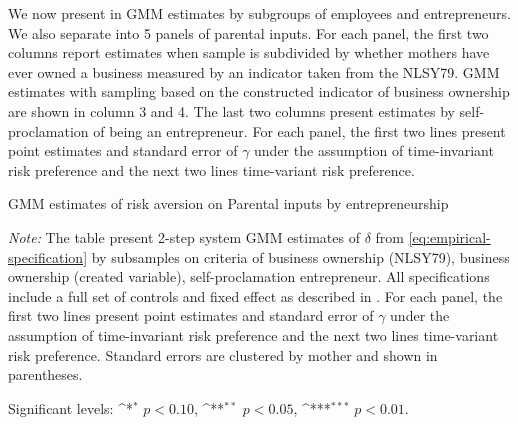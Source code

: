 \documentclass[]{article}
\begin{document}
We now present in  GMM estimates by subgroups of employees and entrepreneurs. We also separate  into 5 panels of parental inputs. For each panel, the first two columns report estimates when sample is subdivided by whether mothers have ever owned a business measured by an indicator taken from the NLSY79. GMM estimates with sampling based on the constructed indicator of business ownership are shown in column 3 and 4. The last two columns present estimates by self-proclamation of being an entrepreneur. For each panel, the first two lines present point estimates and standard error of $\gamma$ under the assumption of time-invariant risk preference and the next two lines time-variant risk preference.


\begin{table}[!htbp]
	\centering
	\begin{threeparttable}
		\def\sym#1{\ifmmode^{#1}\else\(^{#1}\)\fi}
		\caption{GMM estimates of risk aversion on Parental inputs by entrepreneurship}	
		\setlength{\extrarowheight}{0.3em}
		
		\label{table:result-entrepreneur}
		\begin{tablenotes}[flushleft] \footnotesize
			\item \textit{Note:} The table present 2-step system GMM estimates of $\delta$ from \eqref{eq:empirical-specification} by subsamples on criteria of business ownership (NLSY79), business ownership (created variable), self-proclamation entrepreneur. All specifications include a full set of controls and fixed effect as described in . For each panel, the first two lines present point estimates and standard error of $\gamma$ under the assumption of time-invariant risk preference and the next two lines time-variant risk preference. Standard errors are clustered by mother and shown in parentheses. 
			\item Significant levels: \sym{*} \(p<0.10\), \sym{**} \(p<0.05\), \sym{***} \(p<0.01\).
		\end{tablenotes}
	\end{threeparttable}
\end{table}



\end{document}

